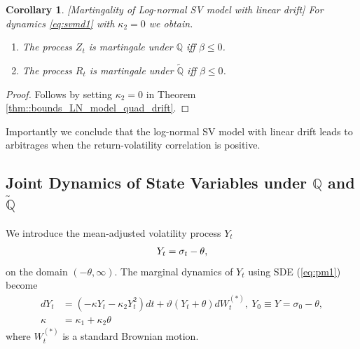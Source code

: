 \documentclass[11pt,a4paper] {article}
\newtheorem{corollary}{Corollary}[section]
\begin{document}
\begin{corollary}\label{prop::bounds_LN_model_lin_drift}[Martingality of Log-normal SV model with linear drift]
For dynamics \eqref{eq:svmd1} with $\kappa_2=0$ we obtain.
\begin{enumerate}%
\item The process $Z_t$ is martingale under $\mathbb{Q}$ iff $\beta\le 0$.
\item The process $R_t$ is martingale under $\tilde{\mathbb{Q}}$ iff $\beta \le 0$.
\end{enumerate} 
\end{corollary}

\begin{proof}
Follows by setting $\kappa_2=0$ in Theorem \ref{thm::bounds_LN_model_quad_drift}.
\end{proof}

Importantly we conclude  that the log-normal SV model with linear drift leads to arbitrages when the return-volatility correlation is positive.



\subsection{Joint Dynamics of State Variables under $\mathbb{Q}$ and $\tilde{\mathbb{Q}}$}

We introduce the mean-adjusted volatility process $Y_t$
\begin{equation} \label{eq:tr2}
\begin{split}
Y_{t} = \sigma_{t}  - \theta,\vspace*{-1.0\baselineskip}
\end{split}
\end{equation}
on the domain $(-\theta, \infty)$. The marginal dynamics of $Y_{t}$ using SDE (\ref{eq:pm1}) become
\begin{equation} \label {eq:vd2}
\begin{split}
dY_{t}& =  \left(- \kappa Y_{t}   - \kappa_{2}Y^{2}_{t}\right)dt+ \vartheta \left(Y_{t}+\theta\right) dW^{(*)}_{t}, \ Y_{0} \equiv Y =\sigma_{0} - \theta,\\
\kappa&=\kappa_1+\kappa_2\theta
\end{split}
\end{equation}
where $W^{(*)}_{t}$ is a standard Brownian motion. 
\end{document}
